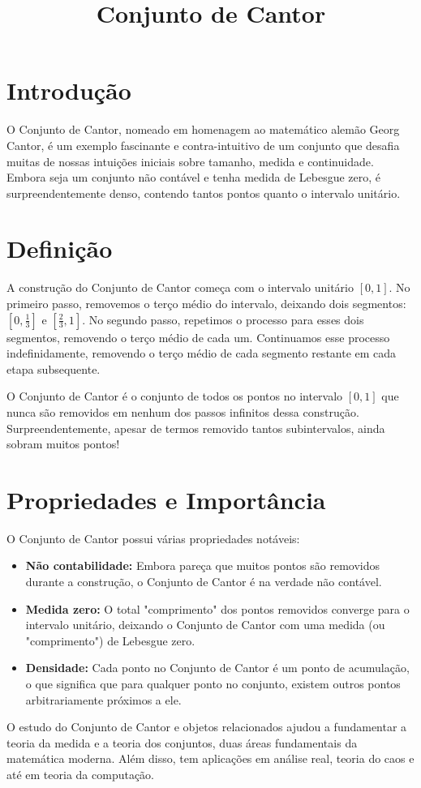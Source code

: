 \documentclass[12pt]{article}
\title{Conjunto de Cantor}
\author{}
\date{}
\begin{document}
	\maketitle
	
	\section{Introdução}
	
	O Conjunto de Cantor, nomeado em homenagem ao matemático alemão Georg Cantor, é um exemplo fascinante e contra-intuitivo de um conjunto que desafia muitas de nossas intuições iniciais sobre tamanho, medida e continuidade. Embora seja um conjunto não contável e tenha medida de Lebesgue zero, é surpreendentemente denso, contendo tantos pontos quanto o intervalo unitário.
	
	\section{Definição}
	
	A construção do Conjunto de Cantor começa com o intervalo unitário \([0, 1]\). No primeiro passo, removemos o terço médio do intervalo, deixando dois segmentos: \([0, \frac{1}{3}]\) e \([\frac{2}{3}, 1]\). No segundo passo, repetimos o processo para esses dois segmentos, removendo o terço médio de cada um. Continuamos esse processo indefinidamente, removendo o terço médio de cada segmento restante em cada etapa subsequente.
	
	O Conjunto de Cantor é o conjunto de todos os pontos no intervalo \([0, 1]\) que nunca são removidos em nenhum dos passos infinitos dessa construção. Surpreendentemente, apesar de termos removido tantos subintervalos, ainda sobram muitos pontos!
	
	\section{Propriedades e Importância}
	
	O Conjunto de Cantor possui várias propriedades notáveis:
	
	\begin{itemize}
		\item \textbf{Não contabilidade:} Embora pareça que muitos pontos são removidos durante a construção, o Conjunto de Cantor é na verdade não contável.
		\item \textbf{Medida zero:} O total "comprimento" dos pontos removidos converge para o intervalo unitário, deixando o Conjunto de Cantor com uma medida (ou "comprimento") de Lebesgue zero.
		\item \textbf{Densidade:} Cada ponto no Conjunto de Cantor é um ponto de acumulação, o que significa que para qualquer ponto no conjunto, existem outros pontos arbitrariamente próximos a ele.
	\end{itemize}
	
	O estudo do Conjunto de Cantor e objetos relacionados ajudou a fundamentar a teoria da medida e a teoria dos conjuntos, duas áreas fundamentais da matemática moderna. Além disso, tem aplicações em análise real, teoria do caos e até em teoria da computação.
	
\end{document}
